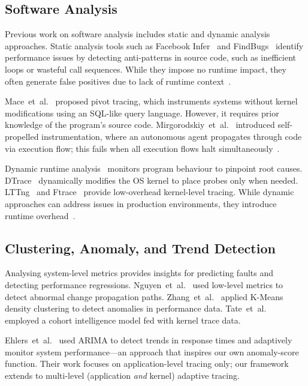 \documentclass[a4paper,fleqn]{cas-sc}
\theoremstyle{plain}
\begin{document}
\subsection{Software Analysis}
Previous work on software analysis includes static and dynamic analysis
approaches.
Static analysis tools such as Facebook Infer~\cite{calcagno2015moving}
and FindBugs~\cite{hovemeyer2004finding}
identify performance issues by detecting anti-patterns in source code, such
as inefficient loops or wasteful call sequences.
While they impose no runtime impact, they often generate false positives due
to lack of runtime context~\cite{jin2012understanding,nistor2015caramel,dai2018hytrace}.

Mace~et~al.~\cite{mace2015pivot} proposed pivot tracing, which instruments
systems without kernel modifications using an SQL-like query language.
However, it requires prior knowledge of the program's source code.
Mirgorodskiy~et~al.~\cite{mirgorodskiy2006automated} introduced self-propelled
instrumentation, where an autonomous agent propagates through code via execution
flow; this fails when all execution flows halt simultaneously~\cite{jin2012understanding}.

Dynamic runtime analysis~\cite{arulraj2013production,dean2014perfscope}
monitors program behaviour to pinpoint root causes.
DTrace~\cite{cantrill2004dynamic} dynamically modifies the OS kernel to
place probes only when needed.
LTTng~\cite{desnoyers2006lttng} and Ftrace~\cite{rostedt2010ftrace} provide
low-overhead kernel-level tracing.
While dynamic approaches can address issues in production environments,
they introduce runtime overhead~\cite{arulraj2013production,dean2014perfscope}.

\subsection{Clustering, Anomaly, and Trend Detection}
Analysing system-level metrics provides insights for predicting faults and
detecting performance regressions.
Nguyen~et~al.~\cite{nguyen2013fchain} used low-level metrics to detect
abnormal change propagation paths.
Zhang~et~al.~\cite{zhang2020diagnostic} applied K-Means density
clustering to detect anomalies in performance data.
Tate~et~al.~\cite{tate2017optimization} employed a cohort intelligence model
fed with kernel trace data.

Ehlers~et~al.~\cite{ehlers2011self} used ARIMA to detect trends in response
times and adaptively monitor system performance---an approach that inspires
our own anomaly-score function.
Their work focuses on application-level tracing only; our framework extends
to multi-level (application \emph{and} kernel) adaptive tracing.
\end{document}
